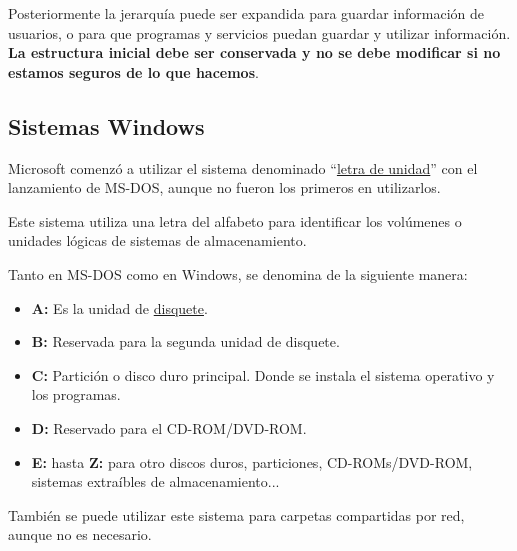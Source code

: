 Posteriormente la jerarquía puede ser expandida para guardar información de usuarios, o para que programas y servicios puedan guardar y utilizar información. \textbf{La estructura inicial debe ser conservada y no se debe modificar si no estamos seguros de lo que hacemos}.


\subsection{Sistemas Windows}
Microsoft comenzó a utilizar el sistema denominado “\href{https://es.wikipedia.org/wiki/Letra_de_unidad}{letra de unidad}” con el lanzamiento de MS-DOS, aunque no fueron los primeros en utilizarlos.

Este sistema utiliza una letra del alfabeto para identificar los volúmenes o unidades lógicas de sistemas de almacenamiento.

Tanto en MS-DOS como en Windows, se denomina de la siguiente manera:

\begin{itemize}
    \item \textbf{A:} Es la unidad de \hyperlink{disquete}{disquete}.
    \item \textbf{B:} Reservada para la segunda unidad de disquete.
    \item \textbf{C:} Partición o disco duro principal. Donde se instala el sistema operativo y los programas.
    \item \textbf{D:} Reservado para el CD-ROM/DVD-ROM.
    \item \textbf{E:} hasta \textbf{Z:} para otro discos duros, particiones, CD-ROMs/DVD-ROM, sistemas extraíbles de almacenamiento...
\end{itemize}

También se puede utilizar este sistema para carpetas compartidas por red, aunque no es necesario.

